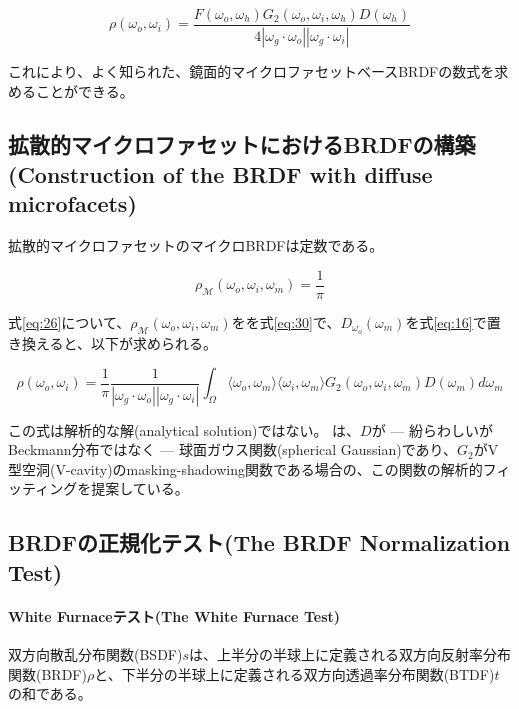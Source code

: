 \documentclass[a4j,xelatex,ja=standard]{bxjsarticle}
\begin{document}
\begin{equation}
    \rho(\omega_o, \omega_i) = \frac{F(\omega_o, \omega_h) G_2(\omega_o, \omega_i, \omega_h) D(\omega_h)}{4|\omega_g \cdot \omega_o| |\omega_g \cdot \omega_i|}
    \label{eq:29}
\end{equation}

これにより、よく知られた、鏡面的マイクロファセットベースBRDFの数式を求めることができる\cite{Walter2007}。

\subsection{拡散的マイクロファセットにおけるBRDFの構築(Construction of the BRDF with diffuse microfacets)}

拡散的マイクロファセットのマイクロBRDFは定数である。

\begin{equation}
    \rho_{\mathcal M}(\omega_o, \omega_i, \omega_m) = \frac{1}{\pi}
    \label{eq:30}
\end{equation}

式\eqref{eq:26}について、$\rho_{\mathcal M}(\omega_o, \omega_i, \omega_m)$をを式\eqref{eq:30}で、$D_{\omega_o}(\omega_m)$を式\eqref{eq:16}で置き換えると、以下が求められる。

\begin{equation}
    \rho(\omega_o, \omega_i) = \frac{1}{\pi} \frac{1}{|\omega_g \cdot \omega_o| |\omega_g \cdot \omega_i|} \int_{\Omega} \langle \omega_o, \omega_m \rangle \langle \omega_i, \omega_m \rangle G_2(\omega_o, \omega_i, \omega_m) D(\omega_m) d\omega_m
    \label{eq:31}
\end{equation}

この式は解析的な解(analytical solution)ではない。\citeauthor{Oren1994} \cite{Oren1994}は、$D$が --- 紛らわしいがBeckmann分布ではなく --- 球面ガウス関数(spherical Gaussian)であり、$G_2$がV型空洞(V-cavity)のmasking-shadowing関数である場合の、この関数の解析的フィッティングを提案している。

\subsection{BRDFの正規化テスト(The BRDF Normalization Test)}

\paragraph{White Furnaceテスト(The White Furnace Test)}

双方向散乱分布関数(BSDF)$s$は、上半分の半球上に定義される双方向反射率分布関数(BRDF)$\rho$と、下半分の半球上に定義される双方向透過率分布関数(BTDF)$t$の和である。
\end{document}
